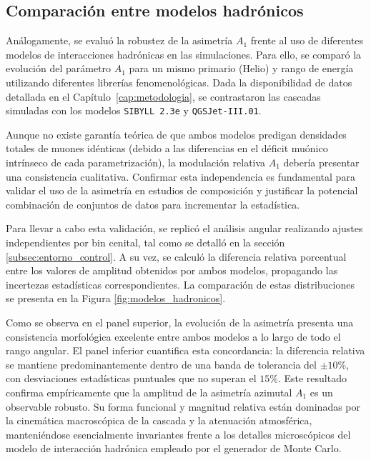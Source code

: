 \subsection{Comparación entre modelos hadrónicos}
\label{subsubsec:independencia_modelo}

Análogamente, se evaluó la robustez de la asimetría $A_1$ frente al uso de diferentes modelos de interacciones hadrónicas en las simulaciones. Para ello, se comparó la evolución del parámetro $A_1$ para un mismo primario (Helio) y rango de energía utilizando diferentes librerías fenomenológicas. Dada la disponibilidad de datos detallada en el Capítulo~\ref{cap:metodologia}, se contrastaron las cascadas simuladas con los modelos \texttt{SIBYLL 2.3e} y \texttt{QGSJet-III.01}.

Aunque no existe garantía teórica de que ambos modelos predigan densidades totales de muones idénticas (debido a las diferencias en el déficit muónico intrínseco de cada parametrización), la modulación relativa $A_1$ debería presentar una consistencia cualitativa. Confirmar esta independencia es fundamental para validar el uso de la asimetría en estudios de composición y justificar la potencial combinación de conjuntos de datos para incrementar la estadística. 

Para llevar a cabo esta validación, se replicó el análisis angular realizando ajustes independientes por bin cenital, tal como se detalló en la sección \ref{subsec:entorno_control}. A su vez, se calculó la diferencia relativa porcentual entre los valores de amplitud obtenidos por ambos modelos, propagando las incertezas estadísticas correspondientes. La comparación de estas distribuciones se presenta en la Figura \ref{fig:modelos_hadronicos}.

Como se observa en el panel superior, la evolución de la asimetría presenta una consistencia morfológica excelente entre ambos modelos a lo largo de todo el rango angular. El panel inferior cuantifica esta concordancia: la diferencia relativa se mantiene predominantemente dentro de una banda de tolerancia del $\pm 10\%$, con desviaciones estadísticas puntuales que no superan el $15\%$. Este resultado confirma empíricamente que la amplitud de la asimetría azimutal $A_1$ es un observable robusto. Su forma funcional y magnitud relativa están dominadas por la cinemática macroscópica de la cascada y la atenuación atmosférica, manteniéndose esencialmente invariantes frente a los detalles microscópicos del modelo de interacción hadrónica empleado por el generador de Monte Carlo.

